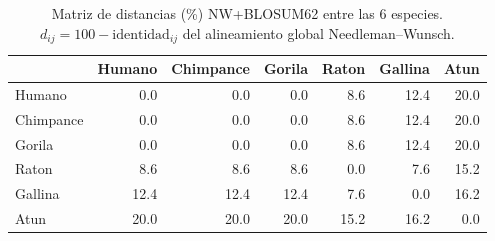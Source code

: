 \begin{table}[h]
\centering
\small
\caption{Matriz de distancias (\%) NW+BLOSUM62 entre las 6 especies. $d_{ij} = 100 - \text{identidad}_{ij}$ del alineamiento global Needleman--Wunsch.}
\begin{tabular}{lrrrrrr}
\toprule
 & Humano & Chimpance & Gorila & Raton & Gallina & Atun \\
\midrule
Humano & 0.0 & 0.0 & 0.0 & 8.6 & 12.4 & 20.0 \\
Chimpance & 0.0 & 0.0 & 0.0 & 8.6 & 12.4 & 20.0 \\
Gorila & 0.0 & 0.0 & 0.0 & 8.6 & 12.4 & 20.0 \\
Raton & 8.6 & 8.6 & 8.6 & 0.0 & 7.6 & 15.2 \\
Gallina & 12.4 & 12.4 & 12.4 & 7.6 & 0.0 & 16.2 \\
Atun & 20.0 & 20.0 & 20.0 & 15.2 & 16.2 & 0.0 \\
\bottomrule
\end{tabular}
\end{table}